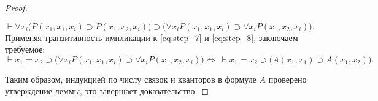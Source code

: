 \begin{proof}
\begin{enumerate}
        \begin{equation}\label{eq:step_8}
            \vdash \forall x_i\big(P(x_1, x_1, x_i) \supset P(x_1, x_2, x_i)\big) \supset \big(\forall x_iP(x_1, x_1, x_i) \supset \forall x_iP(x_1, x_2, x_i)\big).
        \end{equation}
        Применяя транзитивность импликации к \eqref{eq:step_7} и \eqref{eq:step_8}, заключаем требуемое:
        \[
            \vdash x_1 = x_2 \supset \big(\forall x_iP(x_1, x_1, x_i) \supset \forall x_iP(x_1, x_2, x_i)\big) \Longleftrightarrow\ \vdash x_1 = x_2 \supset \big(A(x_1, x_1) \supset A(x_1, x_2)\big).
        \]
    \end{enumerate}
    Таким образом, индукцией по числу связок и кванторов в формуле $A$ проверено утверждение леммы, это завершает доказательство.
\end{proof}

